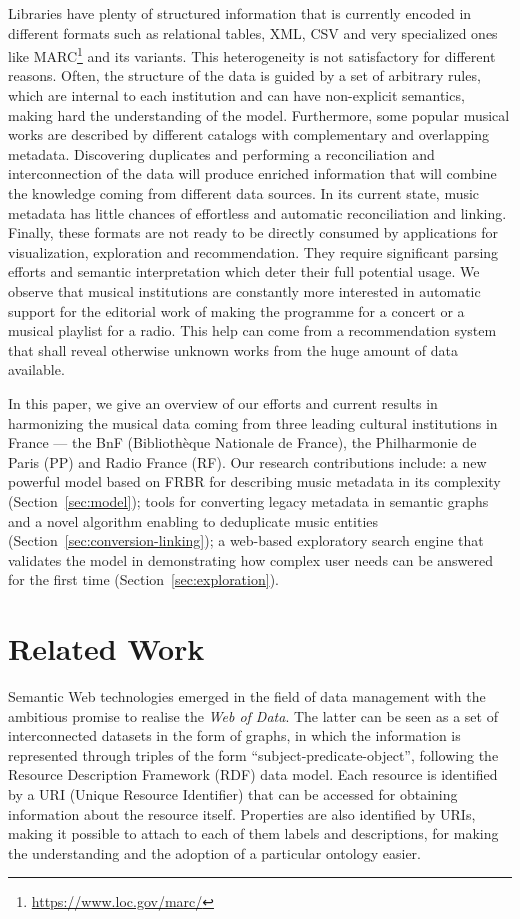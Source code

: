 \documentclass{article}
\begin{document}
Libraries have plenty of structured information that is currently encoded in different formats such as relational tables, XML, CSV and very specialized ones like MARC\footnote{\url{https://www.loc.gov/marc/}} and its variants. This heterogeneity is not satisfactory for different reasons. Often, the structure of the data is guided by a set of arbitrary rules, which are internal to each institution and can have non-explicit semantics, making hard the understanding of the model. Furthermore, some popular musical works are described by different catalogs with complementary and overlapping metadata. Discovering duplicates and performing a reconciliation and interconnection of the data will produce enriched information that will combine the knowledge coming from different data sources. In its current state, music metadata has little chances of effortless and automatic reconciliation and linking. Finally, these formats are not ready to be directly consumed by applications for visualization, exploration and recommendation. They require significant parsing efforts and semantic interpretation which deter their full potential usage. We observe that musical institutions are constantly more interested in automatic support for the editorial work of making the programme for a concert or a musical playlist for a radio. This help can come from a recommendation system that shall reveal otherwise unknown works from the huge amount of data available.

In this paper, we give an overview of our efforts and current results in harmonizing the musical data coming from three leading cultural institutions in France --- the BnF (Biblioth\`eque Nationale de France), the Philharmonie de Paris (PP) and Radio France (RF). Our research contributions include: a new powerful model based on FRBR for describing music metadata in its complexity (Section~\ref{sec:model}); tools for converting legacy metadata in semantic graphs and a novel algorithm enabling to deduplicate music entities (Section~\ref{sec:conversion-linking}); a web-based exploratory search engine that validates the model in demonstrating how complex user needs can be answered for the first time (Section~\ref{sec:exploration}).


\section{Related Work}\label{sec:related-work}
Semantic Web technologies emerged in the field of data management with the ambitious promise to realise the \textit{Web of Data}. The latter can be seen as a set of interconnected datasets in the form of graphs, in which the information is represented through triples of the form ``subject-predicate-object'', following the Resource Description Framework (RDF) data model. Each resource is identified by a URI (Unique Resource Identifier) that can be accessed for obtaining information about the resource itself. Properties are also identified by URIs, making it possible to attach to each of them labels and descriptions, for making the understanding and the adoption of a particular ontology easier.
\end{document}
